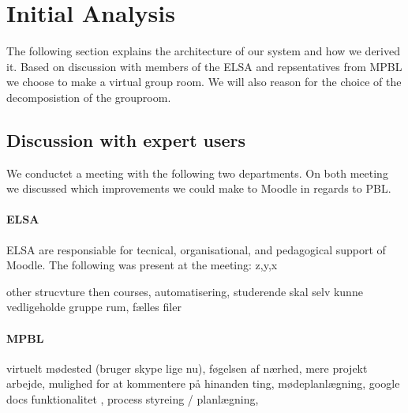 \section{Initial Analysis}
\begin{comment}
In the preliminary phase of working with Electronic-learning (E-learning) it is important for us to ensure that we are in fact working with problems that are relevant in the E-learning and Problem Based Learning (PBL) fields of study, as we are aiming at improving the overall way that the chosen E-learning environment at Aalborg University (AAU), namely Moodle, supports PBL. Because AAU is renowned for its implementation of PBL, we do not have to look very far to find some of the leading experts in this field.
\end{comment}
The following section explains the architecture of our system and how we derived it. Based on discussion with members of the ELSA \cite{x} and repsentatives from MPBL \cite{y} we choose to make a virtual group room. We will also reason for the choice of the decomposistion of the grouproom.

\subsection{Discussion with expert users}   
We conductet a meeting with the following two departments. On both meeting we discussed which improvements we could make to Moodle in regards to PBL.  

\paragraph{ELSA}
ELSA are responsiable for tecnical, organisational, and pedagogical support of Moodle\cite{elsa}. 
The following was present at the meeting: z,y,x

other strucvture then courses, automatisering, studerende skal selv kunne vedligeholde gruppe rum, fælles filer

\paragraph{MPBL}
virtuelt mødested (bruger skype lige nu), føgelsen af nærhed, mere projekt arbejde, mulighed for at kommentere på hinanden ting, mødeplanlægning, google docs funktionalitet , process styreing / planlægning, 



\begin{comment}
To optian domain knowlage of how moodle and Aapbl works 
Domain knowlage
In the initial phase of this project we conducted two interviews with xxx from ELSA\cite{x} and yyy from MPBL. 

interviews
*ELSA
*MPBL

*Baseret på de ting de fortalte ->
*Kommunication
* 
*Fildeling

Opdeling i de 4 områder

*akritektur
\end{comment}

